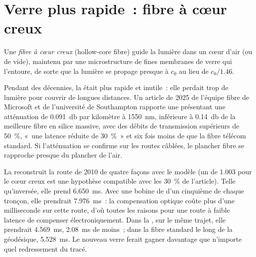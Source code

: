 \section{Verre plus rapide~: fibre à cœur creux}

\begin{definition}\label{def:nw:long-haul-fibre:hcf}
Une \emph{fibre à cœur creux} (hollow-core fibre) guide la lumière dans un cœur d'air (ou de vide), maintenu par une microstructure de fines membranes de verre
qui l'entoure, de sorte que la lumière se propage presque à $c_0$ au lieu de $c_0/1.46$.
\end{definition}

Pendant des décennies, la  était plus rapide et inutile~: elle perdait trop de lumière pour couvrir de longues distances. Un article de 2025 de l'équipe fibre de Microsoft
et de l'université de Southampton rapporte une  présentant une atténuation de \qty{0.091}{\decibel} par kilomètre à \qty{1550}{\nano\metre},
inférieure à \qty{0.14}{\decibel} de la meilleure fibre en silice massive, avec des débits de transmission supérieurs de 50~\%, «~une latence réduite de 30~\%~» et six fois
moins de  que la fibre télécom standard. Si l'atténuation se confirme sur les routes câblées, le plancher fibre se rapproche presque du plancher de l'air.

La  reconstruit la route de 2010 de quatre façons avec le modèle (un  de 1.003 pour le cœur creux est une
hypothèse compatible avec les 30~\% de l'article). Telle qu'inversée, elle prend \qty{6.650}{\milli\second}. Avec une bobine de  d'un cinquième de
chaque tronçon, elle prendrait \qty{7.976}{\milli\second}~: la compensation optique coûte plus d'une milliseconde sur cette route, d'où toutes les raisons pour une route
à faible latence de compenser électroniquement. Dans la , sur le même trajet, elle prendrait \qty{4.569}{\milli\second}, \qty{2.08}{\milli\second}
de moins~; dans la fibre standard le long de la géodésique, \qty{5.528}{\milli\second}. Le nouveau verre ferait gagner davantage que n'importe quel redressement du tracé.

